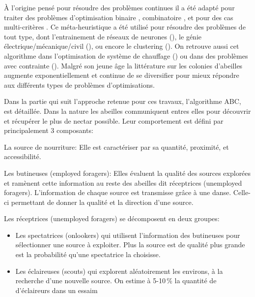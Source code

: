 À l’origine pensé pour résoudre des problèmes continues il a été adapté pour traiter des problèmes
d’optimisation binaire \cite{Kashan2012342}, combinatoire \cite{Karaboga20113021}, et pour des cas multi-critères
\cite{Akbari201239,Omkar2011489}.
Ce méta-heuristique a été utilisé pour résoudre des problèmes de tout type, dont l’entrainement de réseaux de
neurones (\cite{Karaboga2007}), le génie électrique/mécanique/civil (\cite{Rao2009887}), ou encore le clustering (\cite{Zhang20104761}).
On retrouve aussi cet algorithme dans l’optimisation de système de chauffage (\cite{Atashkari2011}) ou dans des problèmes avec
contrainte (\cite{Tsai201480,Karaboga20113021}).
Malgré son jeune âge la littérature sur les colonies d’abeilles augmente exponentiellement et continue de se diversifier
pour mieux répondre aux différents types de problèmes d’optimisations.


Dans la partie qui suit l’approche retenue pour ces travaux, l’algorithme ABC, est détaillée.
Dans la nature les abeilles communiquent entres elles pour découvrir et récupérer le plus
de nectar possible. Leur comportement est défini par principalement 3 composants:
\begin{description}
    \item La source de nourriture: Elle est caractériser par sa quantité, proximité, et accessibilité.
    \item Les butineuses (employed foragers): Elles évaluent la qualité des sources explorées et ramènent cette information
          au reste des abeilles dit réceptrices (unemployed foragers). L’information de chaque source est transmisse
          grâce à une danse. Celle-ci permettant de donner la qualité et la direction d’une source.
    \item Les réceptrices (unemployed foragers) se décomposent en deux groupes:
    \begin{itemize}
        \item Les spectatrices (onlookers) qui utilisent l’information des butineuses pour sélectionner une source à exploiter.
              Plus la source est de qualité plus grande est la probabilité qu’une spectatrice la choisisse.
        \item Les éclaireuses (scouts) qui explorent aléatoirement les environs, à la recherche d’une nouvelle source. On estime à
        5-10\,\% la quantité de d’éclaireurs dans un essaim \cite{Seeley1996}
    \end{itemize}
\end{description}

